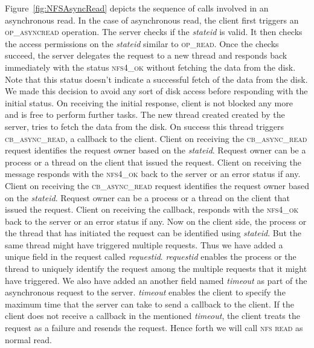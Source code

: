 Figure~\ref{fig:NFSAsyncRead} depicts the sequence of calls involved in an asynchronous read. In the case of asynchronous read, the client first triggers an \textsc{op\_asyncread} operation. The server checks if the \textit{stateid} is valid. It then checks the access permissions on the \textit{stateid} similar to \textsc{op\_read}. Once the checks succeed, the server delegates the request to a new thread and responds back immediately with the status \textsc{nfs4\_ok} without fetching the data from the disk.  Note that this status doesn’t indicate a successful fetch of the data from the disk. We made this decision to avoid any sort of disk access before responding with the initial status. On receiving the initial response, client is not blocked any more and is free to perform further tasks. The new thread created created by the server, tries to fetch the data from the disk. On success this thread triggers  \textsc{cb\_async\_read}, a callback to the client. Client on receiving the \textsc{cb\_async\_read} request identifies the request owner based on the \textit{stateid}. Request owner can  be a process or a thread on the client that issued the request. Client on receiving the message responds with the \textsc{nfs4\_ok} back to the server or an error status if any.  Client on receiving the \textsc{cb\_async\_read} request identifies the request owner based on the \textit{stateid}. Request owner can  be a process or a thread on the client that issued the request. Client on receiving the callback, responds with the \textsc{nfs4\_ok} back to the server or an error status if any. Now on the client side, the process or the thread that has initiated the request can be identified using \textit{stateid}. But the same thread might have triggered multiple requests. Thus we have added a unique field in the request called \textit{requestid}.  \textit{requestid} enables the process or the thread to uniquely identify the request among the multiple requests that it might have triggered. We also have added an another field named  \textit{timeout} as part of  the asynchronous request to the server. \textit{timeout} enables the client to specify the maximum time that the server can take to send a callback to the client. If the client does not receive a callback in the mentioned  \textit{timeout}, the client treats the request as a failure and resends the request.
Hence forth we will call \textsc{nfs read} as normal read.   






